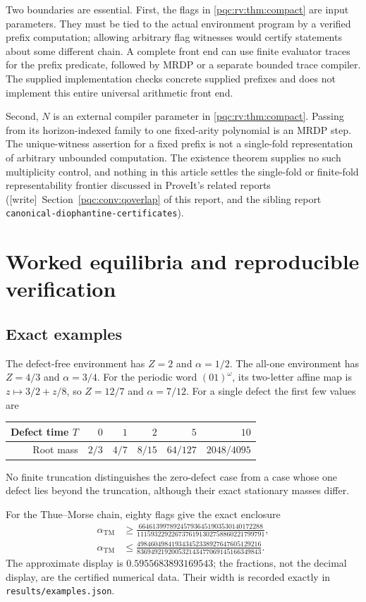 \documentclass[11pt,letterpaper]{article}
\numberwithin{equation}{section}
\theoremstyle{definition}
\theoremstyle{remark}
\newcommand{\code}[1]{\nolinkurl{#1}}
\newcommand{\wtag}{\textup{[write]}}
\newcommand{\srcmark}[1]{\par\noindent{\small\itshape [source~#1]}\par}
\begin{document}
Two boundaries are essential. First, the flags in
\cref{pqc:rv:thm:compact} are input parameters. They must be tied to the
actual environment program by a verified prefix computation; allowing
arbitrary flag witnesses would certify statements about some different
chain. A complete front end can use finite evaluator traces for the
prefix predicate, followed by MRDP or a separate bounded trace compiler.
The supplied implementation checks concrete supplied prefixes and does
not implement this entire universal arithmetic front end.

Second, $N$ is an external compiler parameter in
\cref{pqc:rv:thm:compact}. Passing from its horizon-indexed family to one
fixed-arity polynomial is an MRDP step. The unique-witness assertion
for a fixed prefix is not a single-fold representation of arbitrary
unbounded computation. The existence theorem supplies no such
multiplicity control, and nothing in this article settles the
single-fold or finite-fold representability frontier discussed in
ProveIt's related reports (\wtag\ Section~\ref{pqc:conv:qoverlap} of this report, and the sibling report \code{canonical-diophantine-certificates}).

\section{Worked equilibria and reproducible verification}
\label{pqc:rv:sec:verification}
\srcmark{17}
\subsection{Exact examples}
The defect-free environment has $Z=2$ and $\alpha=1/2$. The all-one
environment has $Z=4/3$ and $\alpha=3/4$. For the periodic word
$(01)^\omega$, its two-letter affine map is
$z\mapsto3/2+z/8$, so $Z=12/7$ and $\alpha=7/12$.
For a single defect the first few values are
\begin{center}
\begin{tabular}{@{}rrrrrr@{}}
\toprule
Defect time $T$ & $0$ & $1$ & $2$ & $5$ & $10$\\
\midrule
Root mass & $2/3$ & $4/7$ & $8/15$ & $64/127$ & $2048/4095$\\
\bottomrule
\end{tabular}
\end{center}
No finite truncation distinguishes the zero-defect case from a case
whose one defect lies beyond the truncation, although their exact
stationary masses differ.

For the Thue--Morse chain, eighty flags give the exact enclosure
\begin{align*}
 \alpha_{\mathrm{TM}}&\geq
 \frac{664613997892457936451903530140172288}
 {1115932292267376191302758860221799791},\\
 \alpha_{\mathrm{TM}}&\leq
 \frac{498460498419343452338927647605129216}
 {836949219200532143477069145166349843}.
\end{align*}
The approximate display is $0.5955683893169543$; the fractions,
not the decimal display, are the certified numerical data. Their
width is recorded exactly in \code{results/examples.json}.
\end{document}
